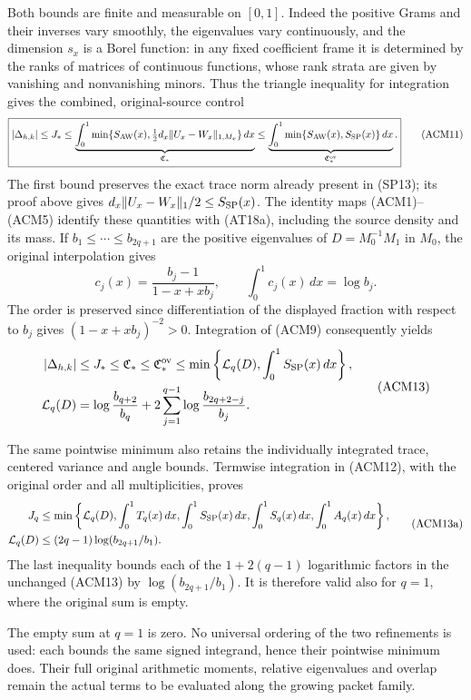 Both bounds are finite and measurable on $[0,1]$. Indeed the positive
Grams and their inverses vary smoothly, the eigenvalues vary
continuously, and the dimension $s_x$ is a Borel function: in any
fixed coefficient frame it is determined by the ranks of matrices
of continuous functions, whose rank strata are given by vanishing
and nonvanishing minors. Thus the triangle inequality for integration
gives the combined, original-source control
\[
 \boxed{
 |\Delta_{h,k}|\le J_*
 \le\underbrace{\int_0^1\min\{S_{\rm AW}(x),
       \tfrac12d_x\|U_x-W_x\|_{1,M_x}\}\,dx}_{\mathfrak C_*}
 \le\underbrace{\int_0^1\min\{S_{\rm AW}(x),S_{\rm SP}(x)\}\,dx}
                _{\mathfrak C_*^{\rm ov}}.}
 \tag{ACM11}
\]
The first bound preserves the exact trace norm already present in
(SP13); its proof above gives $d_x\|U_x-W_x\|_1/2\le S_{\rm SP}(x)$.
The identity maps (ACM1)--(ACM5) identify these quantities with
(AT18a), including the source density and its mass. If $b_1\le\cdots\le b_{2q+1}$ are the positive eigenvalues of
$D=M_0^{-1}M_1$ in $M_0$, the original interpolation gives
\[
 c_j(x)=\frac{b_j-1}{1-x+xb_j},\qquad
 \int_0^1c_j(x)\,dx=\log b_j.
 \tag{ACM12}
\]
The order is preserved since differentiation of the displayed
fraction with respect to $b_j$ gives $(1-x+xb_j)^{-2}>0$.
Integration of (ACM9) consequently yields
\[
 \begin{aligned}
 |\Delta_{h,k}|&\le J_*\le\mathfrak C_*
 \le\mathfrak C_*^{\rm ov}
 \le\min\left\{\mathcal L_q(D),\int_0^1S_{\rm SP}(x)\,dx\right\},\\
 \mathcal L_q(D)&=\log\frac{b_{q+2}}{b_q}
       +2\sum_{j=1}^{q-1}\log\frac{b_{2q+2-j}}{b_j}.
 \end{aligned}
 \tag{ACM13}
\]

The same pointwise minimum also retains the individually integrated
trace, centered variance and angle bounds. Termwise integration in
(ACM12), with the original order and all multiplicities, proves
\[
\begin{split}
 J_q&\leq\min\left\{\mathcal L_q(D),\int_0^1T_q(x)\,dx,
 \int_0^1S_{\rm SP}(x)\,dx,\int_0^1S_q(x)\,dx,
                                      \int_0^1A_q(x)\,dx\right\},\\
 \mathcal L_q(D)&\leq(2q-1)\log(b_{2q+1}/b_1).
\end{split}
\tag{ACM13a}
\]
The last inequality bounds each of the $1+2(q-1)$ logarithmic factors
in the unchanged (ACM13) by $\log(b_{2q+1}/b_1)$. It is therefore
valid also for $q=1$, where the original sum is empty.

The empty sum at $q=1$ is zero. No universal ordering of the two
refinements is used: each bounds the same signed integrand, hence
their pointwise minimum does. Their full original arithmetic
moments, relative eigenvalues and overlap remain the actual terms
to be evaluated along the growing packet family.

